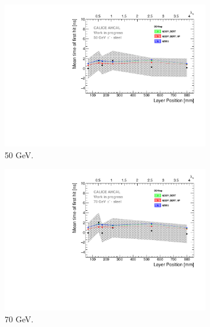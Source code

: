 \begin{figure}[htbp!]
\begin{subfigure}[t]{0.5\textwidth}
    \includegraphics[width=1\textwidth]{../Thesis_Plots/Timing/Pions/Plots/ComparisonToSim/Time_Depth_50GeV_DD4hep.pdf}
    \caption{50 GeV.} \label{fig:Depth_SimData_50GeV_DD4hep}
  \end{subfigure}
  \hfill
  \begin{subfigure}[t]{0.5\textwidth}
    \centering
    \includegraphics[width=1\textwidth]{../Thesis_Plots/Timing/Pions/Plots/ComparisonToSim/Time_Depth_70GeV_DD4hep.pdf}
    \caption{70 GeV.} \label{fig:Depth_SimData_70GeV_DD4hep}
  \end{subfigure}
  \hfill
  \begin{subfigure}[t]{0.5\textwidth}
    \centering

\end{subfigure}
\end{figure}
